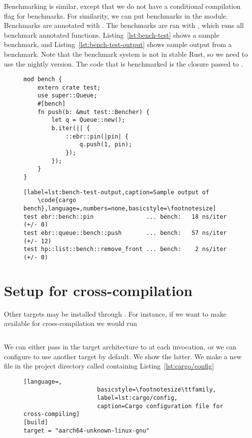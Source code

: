\documentclass[b5paper]{report}
\begin{document}
\begin{appendices}
  Benchmarking is similar, except that we do not have a conditional compilation
  flag for benchmarks. For similarity, we can put benchmarks in the 
  module. Benchmarks are annotated with \code{\#[bench]}. The benchmarks are ran
  with , which runs all benchmark annotated functions.
  Listing~\ref{lst:bench-test} shows a sample benchmark, and
  Listing~\ref{lst:bench-test-output} shows sample output from a benchmark.
  Note that the benchmark system is not in stable Rust, so we need to use the
  nightly version. The code that is benchmarked is the closure passed to
  .
  \begin{figure}[ht!]
  \begin{lstlisting}[label=lst:bench-test,caption=An example benchmark in Rust]
mod bench {
    extern crate test;
    use super::Queue;
    #[bench]
    fn push(b: &mut test::Bencher) {
        let q = Queue::new();
        b.iter(|| {
            ::ebr::pin(|pin| {
                q.push(1, pin);
            });
        });
    }
}
    \end{lstlisting}
  \end{figure}
  \begin{figure}[ht!]
    \begin{lstlisting}[label=lst:bench-test-output,caption=Sample output of
    \code{cargo bench},language=,numbers=none,basicstyle=\footnotesize]
test ebr::bench::pin               ... bench:   18 ns/iter (+/- 0)
test ebr::queue::bench::push       ... bench:   57 ns/iter (+/- 12)
test hp::list::bench::remove_front ... bench:    2 ns/iter (+/- 0)
    \end{lstlisting}
  \end{figure}





  \section{Setup for cross-compilation}
  Other targets may be installed through \rustup{}. For instance, if we want to
  make  available for cross-compilation we would run
  \begin{lstlisting}[language=Bash,numbers=none]
% rustup target add aarch64-unknown-linux-gnu
  \end{lstlisting}
  We can either pass in the target architecture to \cargo{} at each invocation,
  or we can configure \cargo{} to use another target by default. We show the latter.
  We make a new file in the project directory called 
  containing Listing~\ref{lst:cargo/config}
  \begin{figure}[ht]
  \begin{lstlisting}[language=,
                     basicstyle=\footnotesize\ttfamily,
                     label=lst:cargo/config,
                     caption=Cargo configuration file for cross-compiling]
[build]
target = "aarch64-unknown-linux-gnu"


\end{lstlisting}
\end{figure}
\end{appendices}
\end{document}

